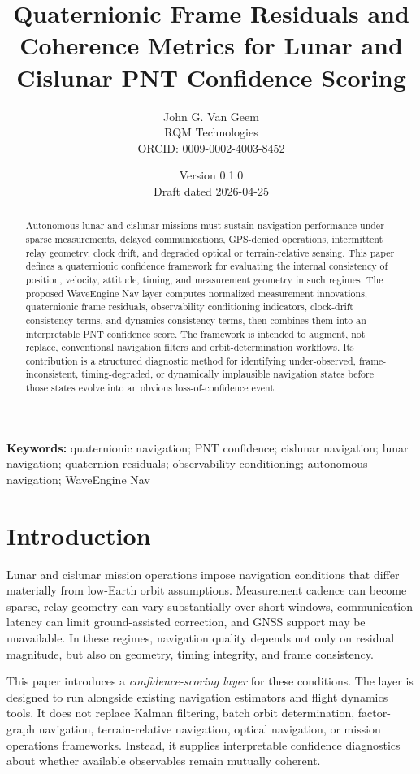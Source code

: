 \documentclass[11pt]{article}
\title{\textbf{Quaternionic Frame Residuals and Coherence Metrics for Lunar and Cislunar PNT Confidence Scoring}}
\author{John G. Van Geem\\
RQM Technologies\\
ORCID: 0009-0002-4003-8452}
\date{Version 0.1.0 \\ Draft dated 2026-04-25}
\theoremstyle{remark}
\begin{document}
\maketitle

\begin{abstract}
Autonomous lunar and cislunar missions must sustain navigation performance under sparse measurements, delayed communications, GPS-denied operations, intermittent relay geometry, clock drift, and degraded optical or terrain-relative sensing. This paper defines a quaternionic confidence framework for evaluating the internal consistency of position, velocity, attitude, timing, and measurement geometry in such regimes. The proposed WaveEngine Nav layer computes normalized measurement innovations, quaternionic frame residuals, observability conditioning indicators, clock-drift consistency terms, and dynamics consistency terms, then combines them into an interpretable PNT confidence score. The framework is intended to augment, not replace, conventional navigation filters and orbit-determination workflows. Its contribution is a structured diagnostic method for identifying under-observed, frame-inconsistent, timing-degraded, or dynamically implausible navigation states before those states evolve into an obvious loss-of-confidence event.
\end{abstract}

\noindent\textbf{Keywords:} quaternionic navigation; PNT confidence; cislunar navigation; lunar navigation; quaternion residuals; observability conditioning; autonomous navigation; WaveEngine Nav

\section{Introduction}

Lunar and cislunar mission operations impose navigation conditions that differ materially from low-Earth orbit assumptions. Measurement cadence can become sparse, relay geometry can vary substantially over short windows, communication latency can limit ground-assisted correction, and GNSS support may be unavailable. In these regimes, navigation quality depends not only on residual magnitude, but also on geometry, timing integrity, and frame consistency.

This paper introduces a \emph{confidence-scoring layer} for these conditions. The layer is designed to run alongside existing navigation estimators and flight dynamics tools. It does not replace Kalman filtering, batch orbit determination, factor-graph navigation, terrain-relative navigation, optical navigation, or mission operations frameworks. Instead, it supplies interpretable confidence diagnostics about whether available observables remain mutually coherent.
\end{document}
